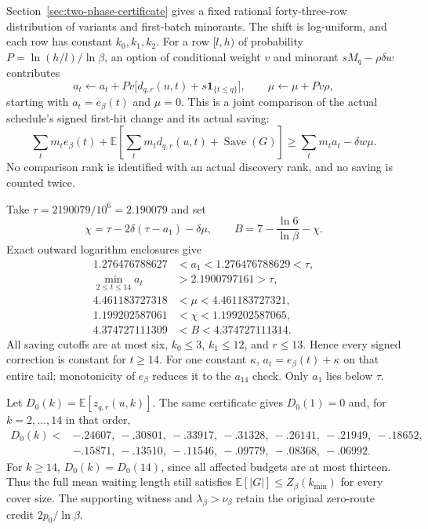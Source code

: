 Section~\ref{sec:two-phase-certificate} gives a fixed rational
forty-three-row distribution of variants and first-batch minorants.
The shift is log-uniform, and each row has constant $k_0,k_1,k_2$.
For a row $[l,h)$ of probability $P=\ln(h/l)/\ln\beta$, an option
of conditional weight $v$ and minorant $sM_q-\rho\delta w$ contributes
\begin{equation}\label{eq:two-phase-coefficients}
 a_t\gets a_t+Pv\bigl[d_{q,r}(u,t)+s\mathbf1_{\{t\le q\}}\bigr],
 \qquad \mu\gets\mu+Pv\rho,
\end{equation}
starting with $a_t=e_\beta(t)$ and $\mu=0$.
This is a joint comparison of the actual schedule's signed first-hit
change and its actual saving:
\[
 \sum_t m_t e_\beta(t)+
 \mathbb E\left[\sum_t m_t d_{q,r}(u,t)
                     +\operatorname{Save}(G)\right]
 \ge\sum_t m_t a_t-\delta w\mu.
\]
No comparison rank is identified with an actual discovery rank, and
no saving is counted twice.

Take $\tau=2190079/10^6=2.190079$ and set
\begin{equation}\label{eq:two-phase-chi-B}
 \chi=\tau-2\delta(\tau-a_1)-\delta\mu,\qquad
 B=7-\frac{\ln6}{\ln\beta}-\chi.
\end{equation}
Exact outward logarithm enclosures give
\[
 \begin{aligned}
 1.276476788627&<a_1<1.276476788629<\tau,\\
 \min_{2\le t\le14}a_t&>2.1900797161>\tau,\\
 4.461183727318&<\mu<4.461183727321,\\
 1.199202587061&<\chi<1.199202587065,\\
 4.374727111309&<B<4.374727111314.
 \end{aligned}
\]
All saving cutoffs are at most six, $k_0\le3$, $k_1\le12$, and
$r\le13$. Hence every signed correction is constant for $t\ge14$.
For one constant $\kappa$, $a_t=e_\beta(t)+\kappa$ on that entire
tail; monotonicity of $e_\beta$ reduces it to the $a_{14}$ check.
Only $a_1$ lies below $\tau$.

Let $D_0(k)=\mathbb E[z_{q,r}(u,k)]$. The same certificate gives
$D_0(1)=0$ and, for $k=2,\ldots,14$ in that order,
\[
 \begin{split}
 D_0(k)<{}&-.24607,\ -.30801,\ -.33917,\ -.31328,
            \ -.26141,\ -.21949,\ -.18652,\\
          &-.15871,\ -.13510,\ -.11546,\ -.09779,
            \ -.08368,\ -.06992.
 \end{split}
\]
For $k\ge14$, $D_0(k)=D_0(14)$, since all affected budgets are at
most thirteen. Thus the full mean waiting length still satisfies
$\mathbb E[|G|]\le Z_\beta(k_{\min})$ for every cover size. The
supporting witness and $\lambda_\beta>\nu_\beta$ retain the original
zero-route credit $2p_0/\ln\beta$.

